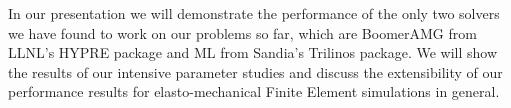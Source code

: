 \documentclass{report}
\begin{document}
In our
presentation we will demonstrate the performance of the only
two solvers we have found to work on our problems so far,
which are BoomerAMG from LLNL's HYPRE package and ML from
Sandia's Trilinos package. We will show the results of our
intensive parameter studies and discuss the extensibility of
our performance results for elasto-mechanical Finite Element
simulations in general.



\end{document}
